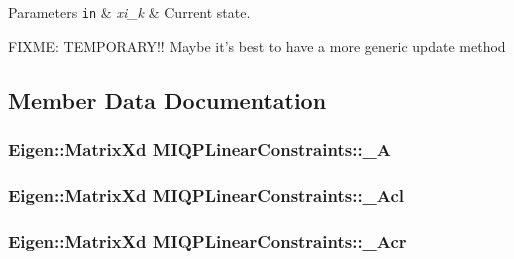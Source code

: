 \begin{DoxyParams}[1]{\-Parameters}
\mbox{\tt in}  & {\em xi\-\_\-k} & \-Current state. \\
\hline
\end{DoxyParams}
\-F\-I\-X\-M\-E\-: \-T\-E\-M\-P\-O\-R\-A\-R\-Y!! \-Maybe it's best to have a more generic update method 

\subsection{\-Member \-Data \-Documentation}
\hypertarget{classMIQPLinearConstraints_a5dfdc7553c4cbbe75ac54b34c4f29732}{
\subsubsection[{\-\_\-\-A}]{\setlength{\rightskip}{0pt plus 5cm}\-Eigen\-::\-Matrix\-Xd {\bf \-M\-I\-Q\-P\-Linear\-Constraints\-::\-\_\-\-A}}}\label{classMIQPLinearConstraints_a5dfdc7553c4cbbe75ac54b34c4f29732}
\hypertarget{classMIQPLinearConstraints_a100ca667cae697cda19ae4aef3543120}{
\subsubsection[{\-\_\-\-Acl}]{\setlength{\rightskip}{0pt plus 5cm}\-Eigen\-::\-Matrix\-Xd {\bf \-M\-I\-Q\-P\-Linear\-Constraints\-::\-\_\-\-Acl}}}\label{classMIQPLinearConstraints_a100ca667cae697cda19ae4aef3543120}
\hypertarget{classMIQPLinearConstraints_a26250a3f878cdacc0fa0c5ccf04d0bed}{
\subsubsection[{\-\_\-\-Acr}]{\setlength{\rightskip}{0pt plus 5cm}\-Eigen\-::\-Matrix\-Xd {\bf \-M\-I\-Q\-P\-Linear\-Constraints\-::\-\_\-\-Acr}}}\label{classMIQPLinearConstraints_a26250a3f878cdacc0fa0c5ccf04d0bed}
